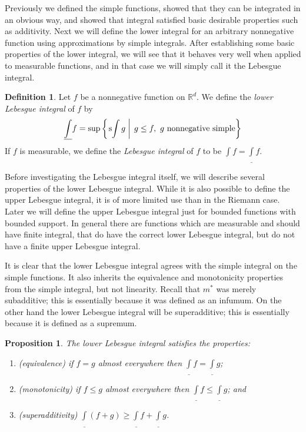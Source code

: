 \documentclass[11pt,oneside]{amsbook}
\newcommand{\RR}{{\mathbb R}}
\newcommand{\lint}{\underline\int}
\theoremstyle{definition}
\theoremstyle{plain}
\newtheorem{prop}[thm]{Proposition}
\theoremstyle{definition}
\newtheorem{defn}[thm]{Definition}
\theoremstyle{remark}
\numberwithin{equation}{section}
\numberwithin{figure}{section}
\begin{document}
Previously we defined the simple functions, showed that they can be integrated in an obvious way, and showed that integral satisfied basic desirable properties such as additivity. Next we will define the lower integral for an arbitrary nonnegative function using approximations by simple integrals. After establishing some basic properties of the lower integral, we will see that it behaves very well when applied to measurable functions, and in that case we will simply call it the Lebesgue integral.

\begin{defn}
  Let $f$ be a nonnegative function on $\RR^d$. We define the \emph{lower Lebesgue integral} of $f$ by
  \[\underline{\int}f=\sup\left\{\left.\text{s}\kern-2pt\int g\;\right|\; g\leq f,\text{ $g$ nonnegative simple}\right\}
  \]
  If $f$ is measurable, we define the \emph{Lebesgue integral} of $f$ to be $\int f=\lint f$.
\end{defn}

Before investigating the Lebesgue integral itself, we will describe several properties of the lower Lebesgue integral. While it is also possible to define the upper Lebesgue integral, it is of more limited use than in the Riemann case. Later we will define the upper Lebesgue integral just for bounded functions with bounded support. In general there are functions which are measurable and should have finite integral, that do have the correct lower Lebesgue integral, but do not have a finite upper Lebesgue integral.

It is clear that the lower Lebesgue integral agrees with the simple integral on the simple functions. It also inherits the equivalence and monotonicity properties from the simple integral, but not linearity. Recall that $m^*$ was merely subadditive; this is essentially because it was defined as an infumum. On the other hand the lower Lebesgue integral will be superadditive; this is essentially because it is defined as a supremum.

\begin{prop}
  The lower Lebesgue integral satisfies the properties:
  \begin{enumerate}
  \item (equivalence) if $f=g$ almost everywhere then $\lint f=\lint g$;
  \item (monotonicity) if $f\leq g$ almost everywhere then $\lint f\leq\lint g$; and
  \item (superadditivity) $\lint(f+g)\geq\lint f+\lint g$.
  \end{enumerate}
\end{prop}
\end{document}
